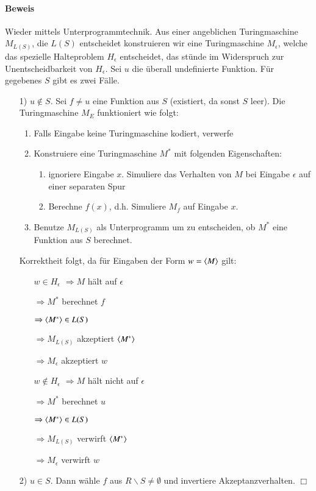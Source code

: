 \paragraph*{Beweis} Wieder mittels Unterprogrammtechnik. Aus einer angeblichen Turingmaschine $M_{L(S)}$, die $L(S)$ entscheidet konstruieren wir eine Turingmaschine $M_\epsilon$, welche das spezielle Halteproblem $H_\epsilon$ entscheidet, das stünde im Widerspruch zur Unentscheidbarkeit von $H_\epsilon$. Sei $u$ die überall undefinierte Funktion. Für gegebenes $S$ gibt es zwei Fälle.
\begin{itemize}
	\item[1)] $u \not\in S$. Sei $f \not= u$ eine Funktion aus $S$ (existiert, da sonst $S$ leer). Die Turingmaschine $M_E$ funktioniert wie folgt:
	\begin{enumerate}
		\item Falls Eingabe keine Turingmaschine kodiert, verwerfe
		\item Konstruiere eine Turingmaschine $M^*$ mit folgenden Eigenschaften:
		\begin{enumerate}
			\item ignoriere Eingabe $x$. Simuliere das Verhalten von $M$ bei Eingabe $\epsilon$ auf einer separaten Spur
			\item Berechne $f(x)$, d.h. Simuliere $M_f$ auf Eingabe $x$.
		\end{enumerate}
		\item Benutze $M_{L(S)}$ als Unterprogramm um zu entscheiden, ob $M^*$ eine Funktion aus $S$ berechnet.
	\end{enumerate}
	\item[] Korrektheit folgt, da für Eingaben der Form $w=\langle M \rangle$ gilt:
	\begin{itemize}
		\item[$w\in  H_\epsilon$] $\Rightarrow M$ hält auf $\epsilon$
		\item[] $\Rightarrow M^*$ berechnet $f$
		\item[] $\Rightarrow \langle M^* \rangle \in L(S)$
		\item[] $\Rightarrow M_{L(S)}$ akzeptiert $\langle M^* \rangle$
		\item[] $\Rightarrow M_\epsilon$ akzeptiert $w$
		\item[$w\not\in  H_\epsilon$] $\Rightarrow M$ hält nicht auf $\epsilon$
		\item[] $\Rightarrow M^*$ berechnet $u$
		\item[] $\Rightarrow \langle M^* \rangle \in L(S)$
		\item[] $\Rightarrow M_{L(S)}$ verwirft $\langle M^* \rangle$
		\item[] $\Rightarrow M_\epsilon$ verwirft $w$
	\end{itemize}
	\item[2)] $u \in S$. Dann wähle $f$ aus $R \backslash S \not= \emptyset$ und invertiere Akzeptanzverhalten. $\Box$
\end{itemize}

